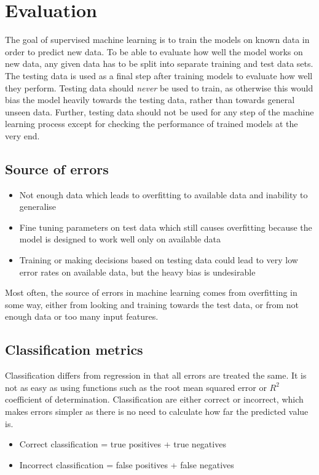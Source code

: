 \documentclass[CS5104-Notes.tex]{subfiles}
\begin{document}
\section{Evaluation}
The goal of supervised machine learning is to train the models on known data in order to predict new data. To be able to evaluate how well the model works on new data, any given data has to be split into separate training and test data sets. The testing data is used as a final step after training models to evaluate how well they perform. Testing data should \textit{never} be used to train, as otherwise this would bias the model heavily towards the testing data, rather than towards general unseen data. Further, testing data should not be used for any step of the machine learning process except for checking the performance of trained models at the very end. 
\subsection{Source of errors}
\begin{itemize}
\item Not enough data which leads to overfitting to available data and inability to generalise
\item Fine tuning parameters on test data which still causes overfitting because the model is designed to work well only on available data
\item Training or making decisions based on testing data could lead to very low error rates on available data, but the heavy bias is undesirable
\end{itemize}
Most often, the source of errors in machine learning comes from overfitting in some way, either from looking and training towards the test data, or from not enough data or too many input features.

\subsection{Classification metrics}
Classification differs from regression in that all errors are treated the same. It is not as easy as using functions such as the root mean squared error or $R^{2}$ coefficient of determination. Classification are either correct or incorrect, which makes errors simpler as there is no need to calculate how far the predicted value is.
\begin{itemize}
\item Correct classification = true positives + true negatives
\item Incorrect classification = false positives + false negatives
\end{itemize}
\end{document}
